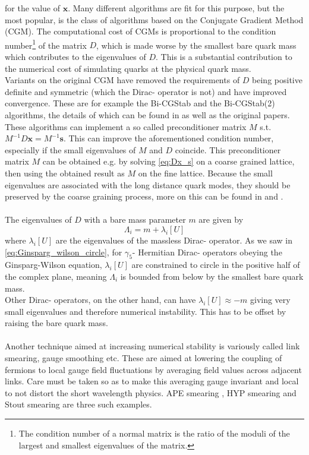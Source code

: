 \documentclass[a4paper,10pt]{article}
\begin{document}
for the value of $\boldsymbol{x}$. Many different algorithms are fit for this purpose, but the most popular, is the class of algorithms based on the Conjugate Gradient Method (CGM). The computational cost of CGMs is proportional to the condition number\footnote{The condition number of a normal matrix is the ratio of the moduli of the largest and smallest eigenvalues of the matrix.} of the matrix $D$, which is made worse by the smallest bare quark mass which contributes to the eigenvalues of $D$. This is a substantial contribution to the numerical cost of simulating quarks at the physical quark mass.\\ Variants on the original CGM have removed the requirements of $D$ being positive definite and symmetric (which the Dirac- operator is not) and have improved convergence. These are for example the Bi-CGStab  \cite{van1992bi} and the Bi-CGStab(2) \cite{gutknecht1993variants} algorithms, the details of which can be found in \cite{templates} as well as the original papers. These algorithms can implement a so called preconditioner matrix $M$ s.t. $M^{-1}D\boldsymbol{x}=M^{-1}\boldsymbol{s}$. This can improve the aforementioned condition number, especially if the small eigenvalues of $M$ and $D$ coincide. This preconditioner matrix $M$ can be obtained e.g. by solving \eqref{eq:Dx_s} on a coarse grained lattice, then using the obtained result as $M$ on the fine lattice. Because the small eigenvalues are associated with the long distance quark modes, they should be preserved by the coarse graining process, more on this can be found in \cite{2003} and \cite{2007}.\\\\The eigenvalues of $D$ with a bare mass parameter $m$ are given by
\begin{equation}
\Lambda_i = m+\lambda_i[U]
\end{equation}
where $\lambda_i[U]$ are the eigenvalues of the massless Dirac- operator. As we saw in \eqref{eq:Ginsparg_wilson_circle}, for $\gamma_5$- Hermitian Dirac- operators obeying the Ginsparg-Wilson equation, $\lambda_i[U]$ are constrained to circle in the positive half of the complex plane, meaning $\Lambda_i$ is bounded from below by the smallest bare quark mass.\\ Other Dirac- operators, on the other hand, can have $\lambda_i[U] \approx -m$ giving very small eigenvalues and therefore numerical instability. This has to be offset by raising the bare quark mass.\\\\Another technique aimed at increasing numerical stability is variously called link smearing, gauge smoothing etc. These are aimed at lowering the coupling of fermions to local gauge field fluctuations by averaging field values across adjacent links. Care must be taken so as to make this averaging gauge invariant and local to not distort the short wavelength physics. APE smearing \cite{albanese1987glueball}, HYP smearing \cite{PhysRevD.64.034504} and Stout smearing \cite{morningstar2004analytic} are three such examples.
\end{document}
